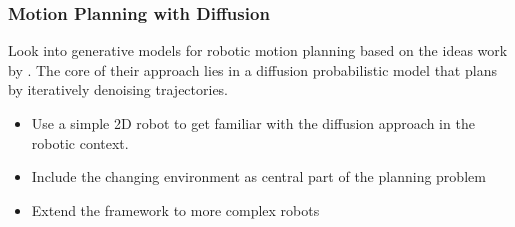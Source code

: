 \documentclass[a4paper]{article}
\begin{document}
\subsubsection{Motion Planning with Diffusion}
Look into generative models for robotic motion planning based on the ideas work by \citet{Janner2022}.
The core of their approach lies in a diffusion probabilistic model that plans by iteratively denoising trajectories.
\begin{itemize}
  \item Use a simple 2D robot to get familiar with the diffusion approach in the robotic context.
  \item Include the changing environment as central part of the planning problem
  \item Extend the framework to more complex robots
\end{itemize}


%

\end{document}
